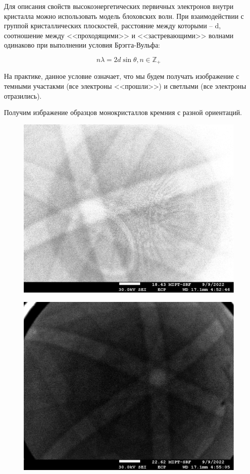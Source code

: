 \documentclass[a4paper,12pt]{article}
\begin{document}
Для описания свойств высокоэнергетических первичных электронов внутри кристалла можно использовать модель блоховских волн. При взаимодействии с группой кристаллических плоскостей, расстояние между которыми -- d,  соотношение между <<проходящими>> и <<застревающими>> волнами одинаково при выполнении условия Брэгга-Вульфа:

\[
    n \lambda = 2d \sin \theta, n \in \mathbb{Z_+}
\]

На практике, данное условие означает, что мы будем получать изображение с темными участакми (все электроны <<прошли>>) и светлыми (все электроны отразились).

Получим избражение образцов монокристаллов кремния с разной ориентаций.

\begin{figure}[h]
\centering
\begin{minipage}{.5\textwidth}
  \centering
  \includegraphics[width=1\linewidth]{Si006 (1).jpg}
  \label{fig:Si006}
\end{minipage}%
\begin{minipage}{.5\textwidth}
  \centering
  \includegraphics[width=1\linewidth]{Si007.jpg}

\end{minipage}
\end{figure}
\end{document}
